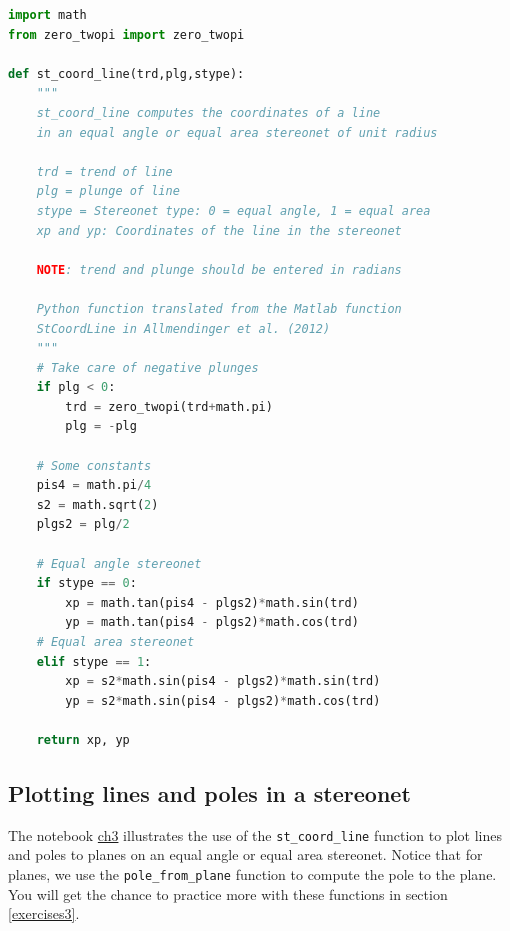 \documentclass[a4paper , 12pt]{book}
\newcommand{\code}[1]{\colorbox{light-gray}{\texttt{#1}}}
\begin{document}
\begin{center}
\begin{lstlisting}[language=Python, frame=single]
import math
from zero_twopi import zero_twopi

def st_coord_line(trd,plg,stype):
	"""
	st_coord_line computes the coordinates of a line
	in an equal angle or equal area stereonet of unit radius
	
	trd = trend of line
	plg = plunge of line
	stype = Stereonet type: 0 = equal angle, 1 = equal area
	xp and yp: Coordinates of the line in the stereonet
	
	NOTE: trend and plunge should be entered in radians
	
	Python function translated from the Matlab function
	StCoordLine in Allmendinger et al. (2012)
	"""
	# Take care of negative plunges
	if plg < 0:
		trd = zero_twopi(trd+math.pi)
		plg = -plg
	
	# Some constants
	pis4 = math.pi/4
	s2 = math.sqrt(2)
	plgs2 = plg/2
	
	# Equal angle stereonet
	if stype == 0:
		xp = math.tan(pis4 - plgs2)*math.sin(trd)
		yp = math.tan(pis4 - plgs2)*math.cos(trd)
	# Equal area stereonet
	elif stype == 1:
		xp = s2*math.sin(pis4 - plgs2)*math.sin(trd)
		yp = s2*math.sin(pis4 - plgs2)*math.cos(trd)
	
	return xp, yp
\end{lstlisting}   
\end{center}

\subsection{Plotting lines and poles in a stereonet}
The notebook \href{https://github.com/nfcd/compGeo/blob/master/source/notebooks/ch3.ipynb}{ch3} illustrates the use of the \code{st\_coord\_line} function to plot lines and poles to planes on an equal angle or equal area stereonet. Notice that for planes, we use the \code{pole\_from\_plane} function to compute the pole to the plane. You will get the chance to practice more with these functions in section \ref{exercises3}.
\end{document}
